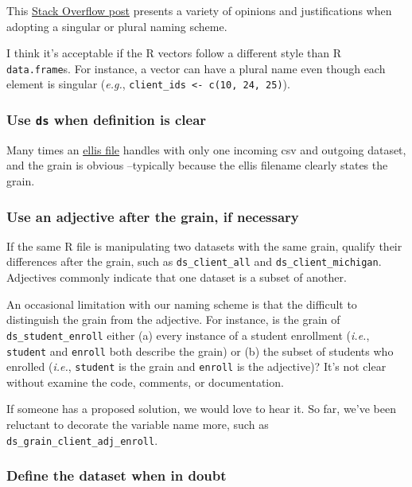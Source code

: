 \documentclass[
]{book}
\begin{document}
This \href{https://stackoverflow.com/questions/338156/table-naming-dilemma-singular-vs-plural-names}{Stack Overflow post} presents a variety of opinions and justifications when adopting a singular or plural naming scheme.

I think it's acceptable if the R vectors follow a different style than R \texttt{data.frame}s. For instance, a vector can have a plural name even though each element is singular (\emph{e.g.}, \texttt{client\_ids\ \textless{}-\ c(10,\ 24,\ 25)}).

\hypertarget{style-naming-datasets-ds-only}{%
\subsubsection{\texorpdfstring{Use \texttt{ds} when definition is clear}{Use ds when definition is clear}}\label{style-naming-datasets-ds-only}}

Many times an \protect\hyperlink{pattern-ellis}{ellis file} handles with only one incoming csv and outgoing dataset, and the grain is obvious --typically because the ellis filename clearly states the grain.

\hypertarget{style-naming-datasets-adjective}{%
\subsubsection{Use an adjective after the grain, if necessary}\label{style-naming-datasets-adjective}}

If the same R file is manipulating two datasets with the same grain, qualify their differences after the grain, such as \texttt{ds\_client\_all} and \texttt{ds\_client\_michigan}. Adjectives commonly indicate that one dataset is a subset of another.

An occasional limitation with our naming scheme is that the difficult to distinguish the grain from the adjective. For instance, is the grain of \texttt{ds\_student\_enroll} either (a) every instance of a student enrollment (\emph{i.e.}, \texttt{student} and \texttt{enroll} both describe the grain) or (b) the subset of students who enrolled (\emph{i.e.}, \texttt{student} is the grain and \texttt{enroll} is the adjective)? It's not clear without examine the code, comments, or documentation.

If someone has a proposed solution, we would love to hear it. So far, we've been reluctant to decorate the variable name more, such as \texttt{ds\_grain\_client\_adj\_enroll}.

\hypertarget{style-naming-datasets-define}{%
\subsubsection{Define the dataset when in doubt}\label{style-naming-datasets-define}}
\end{document}
